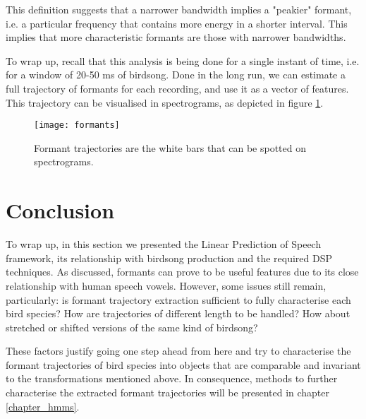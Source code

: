 \documentclass[../main.tex]{subfiles}
\begin{document}
\par This definition suggests that a narrower bandwidth implies a "peakier" formant, i.e. a particular frequency that contains more energy in a shorter interval. This implies that more characteristic formants are those with narrower bandwidths.
\par To wrap up, recall that this analysis is being done for a single instant of time, i.e. for a window of 20-50 ms of birdsong. Done in the long run, we can estimate a full trajectory of formants for each recording, and use it as a vector of features. This trajectory can be visualised in spectrograms, as depicted in figure \ref{fig_specformants}.
\begin{figure}[t]
\centering
\texttt{[image: formants]}
\caption{Formant trajectories are the white bars that can be spotted on spectrograms. }
\label{fig_specformants}
\end{figure}


\section{Conclusion} \label{section_form_estimation}
To wrap up, in this section we presented the Linear Prediction of Speech framework, its relationship with birdsong production and the required DSP techniques. As discussed, formants can prove to be useful features due to its close relationship with human speech vowels. However, some issues still remain, particularly: is formant trajectory extraction sufficient to fully characterise each bird species? How are trajectories of different length to be handled? How about stretched or shifted versions of the same kind of birdsong? 
\par These factors justify going one step ahead from here and try to characterise the formant trajectories of bird species into objects that are comparable and invariant to the transformations mentioned above. In consequence, methods to further characterise the extracted formant trajectories will be presented in chapter \ref{chapter_hmms}. 
    
\end{document}
